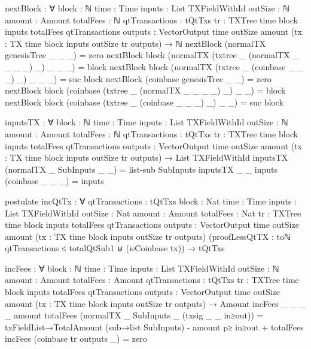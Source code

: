 \documentclass{beamer}
\begin{document}
\begin{code}
        nextBlock : ∀ {block : ℕ} {time : Time}
          {inputs : List TXFieldWithId}
          {outSize : ℕ} {amount : Amount}
          {totalFees : ℕ} {qtTransactions : tQtTxs}
          {tr : TXTree time block inputs totalFees qtTransactions}
          {outputs : VectorOutput time outSize amount}
          (tx : TX {time} {block} {inputs} {outSize} tr outputs)
          → ℕ
        nextBlock (normalTX genesisTree _ _ _) = zero
        nextBlock {block} (normalTX (txtree _ (normalTX _ _ _ _) _) _ _ _) = block
        nextBlock {block} (normalTX (txtree _ (coinbase _ _ _) _) _ _ _) = suc block
        nextBlock (coinbase genesisTree _ _) = zero
        nextBlock {block} (coinbase (txtree _ (normalTX _ _ _ _) _) _ _) = block
        nextBlock {block} (coinbase (txtree _ (coinbase _ _ _) _) _ _) = suc block

        inputsTX : ∀ {block : ℕ} {time : Time}
          {inputs : List TXFieldWithId}
          {outSize : ℕ} {amount : Amount}
          {totalFees : ℕ} {qtTransactions : tQtTxs}
          {tr : TXTree time block inputs totalFees qtTransactions}
          {outputs : VectorOutput time outSize amount}
          (tx : TX {time} {block} {inputs} {outSize} tr outputs)
          → List TXFieldWithId
        inputsTX (normalTX _ SubInputs _ _) = list-sub SubInputs
        inputsTX {_} {_} {inputs} (coinbase _ _ _) = inputs

        postulate
          incQtTx : ∀ {qtTransactions : tQtTxs}
            {block : Nat} {time : Time}
            {inputs : List TXFieldWithId}
            {outSize : Nat} {amount : Amount}
            {totalFees : Nat}
            {tr : TXTree time block inputs totalFees qtTransactions}
            {outputs : VectorOutput time outSize amount}
            (tx : TX {time} {block} {inputs} {outSize} tr outputs)
            (proofLessQtTX :
                toℕ qtTransactions ≤ totalQtSub1
                ⊎
                (isCoinbase tx))
            → tQtTxs

        incFees : ∀ {block : ℕ} {time : Time}
          {inputs : List TXFieldWithId}
          {outSize : ℕ} {amount : Amount}
          {totalFees : Amount} {qtTransactions : tQtTxs}
          {tr : TXTree time block inputs totalFees qtTransactions}
          {outputs : VectorOutput time outSize amount}
          (tx : TX {time} {block} {inputs} {outSize} tr outputs)
          → Amount
        incFees {_} {_} {_} {_} {amount} {totalFees}
          (normalTX _ SubInputs _ (txsig _ _ in≥out)) =
          txFieldList→TotalAmount (sub→list SubInputs)
          - amount p≥ in≥out
          + totalFees
        incFees (coinbase tr outputs _) = zero


\end{code}
\end{document}
